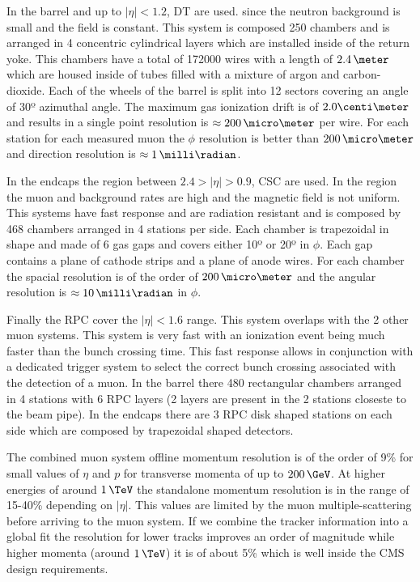 In the barrel and up to $|\eta|<1.2$, \gls{DT} are used. since the neutron background is small and the field is constant. This system is composed 250 chambers and is arranged in 4 concentric cylindrical layers which are installed inside of the return yoke. This chambers have a total of 172000 wires with a length of $2.4\,\meter$ which are housed inside of tubes filled with a mixture of argon and carbon-dioxide. Each of the wheels of the barrel is split into 12 sectors covering an angle of 30º azimuthal angle. The maximum gas ionization drift is of $2.0 \centi\meter$ and results in a single point resolution is $\approx 200\,\micro\meter$ per wire. For each station for each measured muon the $\phi$ resolution is better than $200\,\micro\meter$ and direction resolution is $\approx 1\,\milli\radian$.

In the endcaps the region between $2.4>|\eta|>0.9$, \gls{CSC} are used. In the region the muon and background rates are high and the magnetic field is not uniform. This systems have fast response and are radiation resistant and is composed by 468 chambers arranged in 4 stations per side. Each chamber is trapezoidal in shape and made of 6 gas gaps and covers either 10º or 20º in $\phi$. Each gap contains a plane of cathode strips and a plane of anode wires. For each chamber the spacial resolution is of the order of $200\,\micro\meter$ and the angular resolution is $\approx 10\,\milli\radian$ in $\phi$.

Finally the \gls{RPC} cover the $|\eta|<1.6$ range. This system overlaps with the 2 other muon systems. This system is very fast with an ionization event being much faster than the bunch crossing time. This fast response allows in conjunction with a dedicated trigger system to select the correct bunch crossing associated with the detection of a muon. In the barrel there 480 rectangular chambers arranged in 4 stations with 6 \gls{RPC} layers (2 layers are present in the 2 stations closeste to the beam pipe). In the endcaps there are 3 \gls{RPC} disk shaped stations on each side which are composed by trapezoidal shaped detectors.

The combined muon system offline momentum resolution is of the order of 9\% for small values of $\eta$ and $p$ for transverse momenta of up to $200\,\GeV$. At higher energies of around $1\,\TeV$ the standalone momentum resolution is in the range of 15-40\% depending on $|\eta|$. This values are limited by the muon multiple-scattering before arriving to the muon system. If we combine the tracker information into a global fit the resolution for lower \pt tracks improves an order of magnitude while higher momenta (around $1\,\TeV$) it is of about 5\% which is well inside the \gls{CMS} design requirements.

